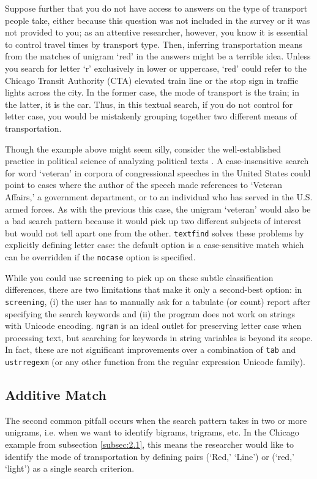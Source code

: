 Suppose further that you do not have access to answers on the type of transport people take, either because this question was not included in the survey or it was not provided to you; as an attentive researcher, however, you know it is essential to control travel times by transport type. Then, inferring transportation means from the matches of unigram `red' in the answers might be a terrible idea. Unless you search for letter `r' exclusively in lower or uppercase, `red' could refer to the Chicago Transit Authority (CTA) elevated train line or the stop sign in traffic lights across the city. In the former case, the mode of transport is the train; in the latter, it is the car. Thus, in this textual search, if you do not control for letter case, you would be mistakenly grouping together two different means of transportation.

Though the example above might seem silly, consider the well-established practice in political science of analyzing political texts \citep{GrimmerTextDataPromise2013a}. A case-insensitive search for word `veteran' in corpora of congressional speeches in the United States could point to cases where the author of the speech made references to `Veteran Affairs,' a government department, or to an individual who has served in the U.S. armed forces. As with the previous this case, the unigram `veteran' would also be a bad search pattern because it would pick up two different subjects of interest but would not tell apart one from the other. {\tt textfind} solves these problems by explicitly defining letter case: the default option is a case-sensitive match which can be overridden if the {\tt nocase} option is specified.

While you could use {\tt screening} to pick up on these subtle classification differences, there are two limitations that make it only a second-best option: in {\tt screening}, (i) the user has to manually ask for a tabulate (or count) report after specifying the search keywords and (ii) the program does not work on strings with Unicode encoding. {\tt ngram} is an ideal outlet for preserving letter case when processing text, but searching for keywords in string variables is beyond its scope. In fact, these are not significant improvements over a combination of {\tt tab} and {\tt ustrregexm} (or any other function from the regular expression Unicode family).

\subsection[Additive]{Additive Match}
The second common pitfall occurs when the search pattern takes in two or more unigrams, i.e. when we want to identify bigrams, trigrams, etc. In the Chicago example from subsection \ref{subsec:2.1}, this means the researcher would like to identify the mode of transportation by defining pairs (`Red,' `Line') or (`red,' `light') as a single search criterion.

